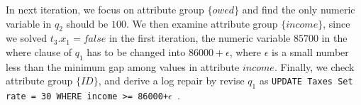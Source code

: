 \begin{example}
\smallskip

In next iteration, we focus on attribute group $\{owed\}$ and find
the only numeric variable in $q_2$ should be $100$.
We then examine attribute group $\{income\}$, since we solved
$t_3.x_1 = false$ in the first iteration, the numeric 
variable $85700$ in the where clause of $q_1$ has to be 
changed into $86000+\epsilon$, where $\epsilon$
is a small number less than the minimum gap among values in
attribute $income$. Finally, we check attribute group
$\{ID\}$, and derive a log repair by revise $q_1$ as
\texttt{UPDATE Taxes Set rate = 30 WHERE income >= 86000+$\epsilon$ }. 
\end{example}






